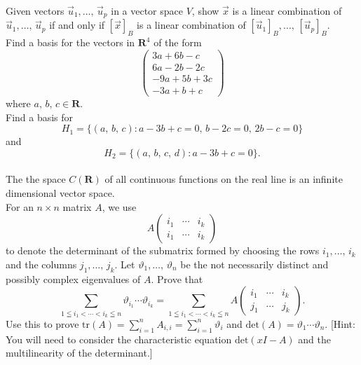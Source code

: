 \documentclass[a4paper,11pt]{article}
\newcommand{\R}{\mathbf{R}}
\begin{document}
 Given vectors $\vec u_1, \dots,\, \vec u_p$ in a
vector space $V$, show $\vec x$ is a linear combination of $\vec u_1, \dots,\,
\vec u_p$ if and only if $[\vec x]_B$ is a linear combination of $[\vec u_1]_B,
\dots,\, [\vec u_p]_B$. \\

 Find a basis for the vectors in $\R^4$ of the form
\[
  \left(
    \begin{array}{c}
      3a+6b-c \\
      6a-2b-2c \\
      -9a+5b+3c \\
      -3a+b+c
    \end{array}
  \right)
\]
where $a,\,b,\,c \in \R$. \\

 Find a basis for
\[
  H_1 = \{(a,\,b,\,c) : a-3b+c=0,\,b-2c=0,\,2b-c=0\}
\]
and
\[
  H_2 = \{(a,\,b,\,c,\,d) : a-3b+c=0\}.
\] \\

 The the space $C(\R)$ of all continuous functions
on the real line is an infinite dimensional vector space. \\

 For an $n \times n$ matrix $A$, we use
\[
  A\begin{pmatrix}i_1 & \cdots & i_k \\ i_1 & \cdots & i_k\end{pmatrix}
\]
to denote the determinant of the submatrix formed by choosing the rows
$i_1,\dots,\,i_k$ and the columns $j_1,\dots,\,j_k$. Let
$\vartheta_1,\dots,\,\vartheta_n$ be the not necessarily distinct and possibly
complex eigenvalues of $A$. Prove that
\[
  \sum_{1 \leqq i_1 < \cdots < i_k \leqq n} \vartheta_{i_1}\cdots\vartheta_{i_k}
  = \sum_{1 \leqq i_1 < \cdots < i_k \leqq n} A
  \begin{pmatrix}
    i_1 & \cdots & i_k \\ j_1 & \cdots & j_k
  \end{pmatrix}.
\]
Use this to prove $\text{tr}(A)=\sum_{i=1}^n A_{i,i} = \sum_{i=1}^n \vartheta_i$
and $\text{det}(A)=\vartheta_1 \cdots \vartheta_n$. [Hint: You will need to
consider the characteristic equation $\text{det}(xI-A)$ and the multilinearity
of the determinant.]
\end{document}
